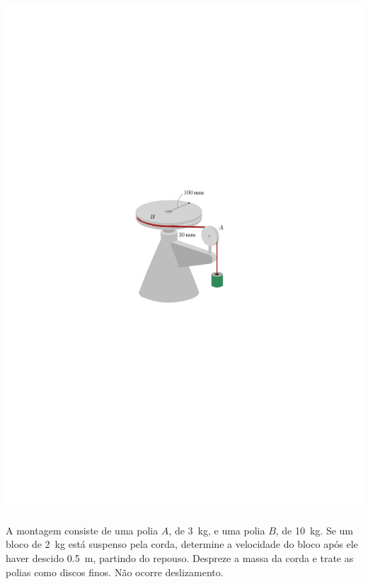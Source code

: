 \begin{minipage}{.5\linewidth}
	\begin{flushleft}
		\includegraphics[scale=1.2]{../../images/draw_6_1}
	\end{flushleft}
\end{minipage}
\begin{minipage}{.5\linewidth}
	\vspace{-1cm}
	\item A montagem consiste de uma polia $A$, de \SI{3}{\kilogram}, e uma polia $B$, de \SI{10}{\kilogram}. Se um bloco de \SI{2}{\kilogram} está suspenso pela corda, determine a velocidade do bloco após ele haver descido \SI{.5}{\meter}, partindo do repouso. Despreze a massa da corda e trate as polias como discos finos. Não ocorre deslizamento.
\end{minipage}